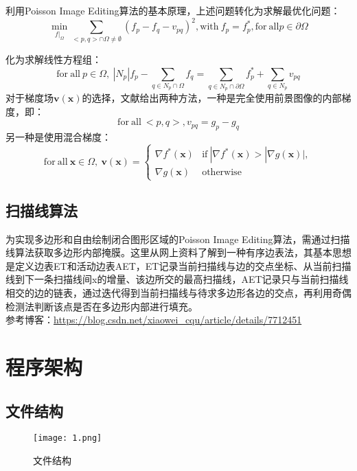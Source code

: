 \documentclass[14pt]{scrartcl} %
\begin{document}
利用Poisson Image Editing算法的基本原理，上述问题转化为求解最优化问题：
\begin{equation}
\min\limits_{f|_\Omega}\sum\limits_{<p,q>\cap \Omega\neq \emptyset}(f_p-f_q-v_{pq})^2,\mathrm{with}\ f_p=f_p^*,\mathrm{for}\ \mathrm{all}p\in \partial\Omega
\end{equation}

化为求解线性方程组：
\begin{equation}
\mathrm{for}\ \mathrm{all}\ p\in \Omega,\ |N_p|f_p-\sum\limits_{q\in N_p\cap \Omega} f_q=\sum\limits_{q\in N_p\cap \partial \Omega}f_p^*+\sum\limits_{q\in N_p}v_{pq}
\end{equation}
对于梯度场$\boldsymbol{v}(\boldsymbol{x})$的选择，文献\cite{perez2003poisson}给出两种方法，一种是完全使用前景图像的内部梯度，即：
\begin{equation}
\mathrm{for}\ \mathrm{all}\ <p,q>,v_{pq}=g_p-g_q
\end{equation}
另一种是使用混合梯度：
\begin{equation}
\mathrm{for}\ \mathrm{all}\ \boldsymbol{x}\in \Omega,\ \boldsymbol{v}(\boldsymbol{x})=\begin{cases}
\nabla f^*(\boldsymbol{x})&\mathrm{if}\ |\nabla f^*(\boldsymbol{x})>|\nabla g(\boldsymbol{x})|,\\
\nabla g(\boldsymbol{x})&\mathrm{otherwise}
\end{cases} 
\end{equation}

\subsection{扫描线算法}
为实现多边形和自由绘制闭合图形区域的Poisson Image Editing算法，需通过扫描线算法获取多边形内部掩膜。这里从网上资料了解到一种有序边表法，其基本思想是定义边表ET和活动边表AET，ET记录当前扫描线与边的交点坐标、从当前扫描线到下一条扫描线间x的增量、该边所交的最高扫描线，AET记录只与当前扫描线相交的边的链表，通过迭代得到当前扫描线与待求多边形各边的交点，再利用奇偶检测法判断该点是否在多边形内部进行填充。\\ 参考博客：\url{https://blog.csdn.net/xiaowei\_cqu/article/details/7712451}


\pagebreak
\section{程序架构}
\subsection{文件结构}
\begin{figure}[h] %
	\centering
	\texttt{[image: 1.png]} %
	\caption{文件结构}
\end{figure}
\end{document}
